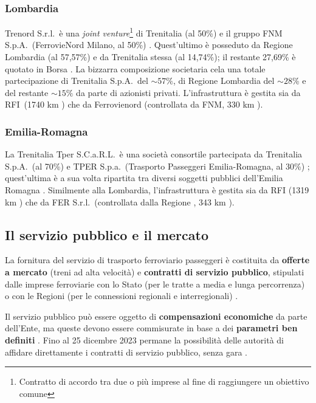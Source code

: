 \documentclass[12pt,italian]{report}
\begin{document}
\subsubsection{Lombardia}

Trenord S.r.l.\ è una \textit{joint venture}\footnote{Contratto di
    accordo tra due o più imprese al fine di raggiungere un obiettivo
    comune} di Trenitalia (al 50\%) e il gruppo FNM S.p.A.\
(FerrovieNord Milano, al 50\%) \cite{TrenordChiSiamo}.  Quest'ultimo è
posseduto da Regione Lombardia (al 57,57\%) e da Trenitalia stessa (al
14,74\%); il restante 27,69\% è quotato in Borsa
\cite{BorsaItalianaFNM}.  La bizzarra composizione societaria cela una
totale partecipazione di Trenitalia S.p.A.\ del $\sim 57\%$, di
Regione Lombardia del $\sim 28$\% e del restante $\sim 15\%$ da parte
di azionisti privati.  L'infrastruttura è gestita sia da RFI\ (1740 km
\cite{RfiKm}) che da Ferrovienord (controllata da FNM, 330 km
\cite{FerNordKm}).

\subsubsection{Emilia-Romagna}

La Trenitalia Tper S.C.a.R.L.\ è una società consortile partecipata da
Trenitalia S.p.A.\ (al 70\%) e TPER S.p.a.\ (Trasporto Passeggeri
Emilia-Romagna, al 30\%) \cite{NascitaTper}; quest'ultima è a sua
volta ripartita tra diversi soggetti pubblici dell'Emilia Romagna
\cite{SociTper}.  Similmente alla Lombardia, l'infrastruttura è
gestita sia da RFI (1319 km \cite{RfiKm}) che da FER S.r.l.\
(controllata dalla Regione \cite{FerChiSiamo}, 343 km \cite{FerKm}).

\subsection{Il servizio pubblico e il mercato}
\label{servizio_pubblico}

La fornitura del servizio di trasporto ferroviario passeggeri è
costituita da \textbf{offerte a mercato} (treni ad alta velocità) e
\textbf{contratti di servizio pubblico}, stipulati dalle imprese
ferroviarie con lo Stato (per le tratte a media e lunga percorrenza) o
con le Regioni (per le connessioni regionali e interregionali)
\cite[vedi][paragrafo \textit{``Gli obblighi di servizio pubblico e i
    contratti di servizio''}]{CameraTrasportoFerroviario}.

Il servizio pubblico può essere oggetto di \textbf{compensazioni
    economiche} da parte dell'Ente, ma queste devono essere
commisurate in base a dei \textbf{parametri ben definiti} \cite[art.\
4, comma 1]{Reg1370}.  Fino al 25 dicembre 2023 permane la possibilità
delle autorità di affidare direttamente i contratti di servizio
pubblico, senza gara \cite[art.\ 8, comma 2, lettera iii)]{Reg1370}.
\end{document}
